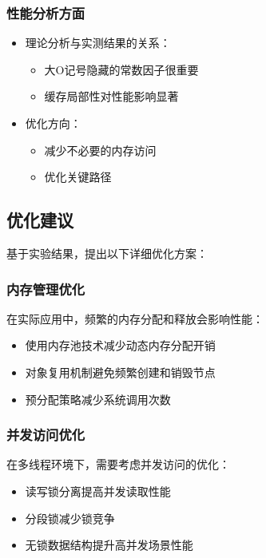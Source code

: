 \documentclass[12pt,a4paper]{article}
\begin{document}
\subsubsection{性能分析方面}
\begin{itemize}
\item 理论分析与实测结果的关系：
  \begin{itemize}
  \item 大O记号隐藏的常数因子很重要
  \item 缓存局部性对性能影响显著
  \end{itemize}
\item 优化方向：
  \begin{itemize}
  \item 减少不必要的内存访问
  \item 优化关键路径
  \end{itemize}
\end{itemize}

\subsection{优化建议}
基于实验结果，提出以下详细优化方案：

\subsubsection{内存管理优化}
在实际应用中，频繁的内存分配和释放会影响性能：
\begin{itemize}
\item 使用内存池技术减少动态内存分配开销
\item 对象复用机制避免频繁创建和销毁节点
\item 预分配策略减少系统调用次数
\end{itemize}

\subsubsection{并发访问优化}
在多线程环境下，需要考虑并发访问的优化：
\begin{itemize}
\item 读写锁分离提高并发读取性能
\item 分段锁减少锁竞争
\item 无锁数据结构提升高并发场景性能
\end{itemize}
\end{document}
